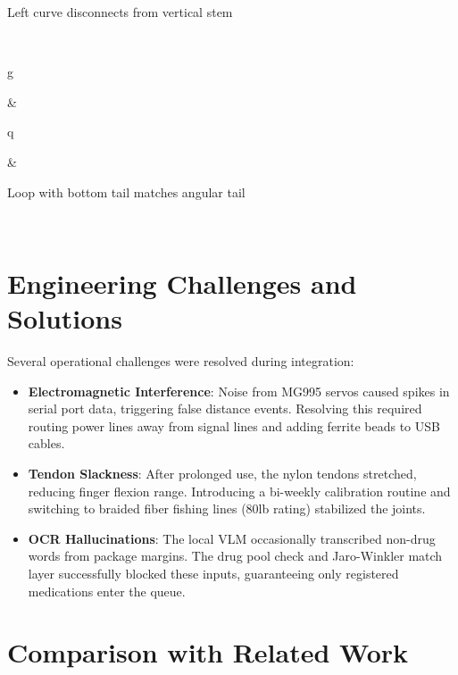 \documentclass[12pt,a4paper,oneside]{report}
\begin{document}
\begin{longtable}[]
\begin{minipage}[b]{\linewidth}
Left curve disconnects from vertical stem

\end{minipage} \\
\begin{minipage}[b]{\linewidth}\centering
g
\end{minipage} & \begin{minipage}[b]{\linewidth}\centering
q
\end{minipage} & \begin{minipage}[b]{\linewidth}\raggedright

Loop with bottom tail matches angular tail

\end{minipage} \\
\midrule\noalign{}
\endhead
\bottomrule\noalign{}
\endlastfoot
\end{longtable}

\section{Engineering Challenges and
Solutions}\label{engineering-challenges-and-solutions}

Several operational challenges were resolved during integration:

\begin{itemize}
\item
  \textbf{Electromagnetic Interference}: Noise from MG995 servos caused
  spikes in serial port data, triggering false distance events.
  Resolving this required routing power lines away from signal lines and
  adding ferrite beads to USB cables.
\item
  \textbf{Tendon Slackness}: After prolonged use, the nylon tendons
  stretched, reducing finger flexion range. Introducing a bi-weekly
  calibration routine and switching to braided fiber fishing lines (80lb
  rating) stabilized the joints.
\item
  \textbf{OCR Hallucinations}: The local VLM occasionally transcribed
  non-drug words from package margins. The drug pool check and
  Jaro-Winkler match layer successfully blocked these inputs,
  guaranteeing only registered medications enter the queue.
\end{itemize}

\section{Comparison with Related
Work}\label{comparison-with-related-work}
\end{document}

